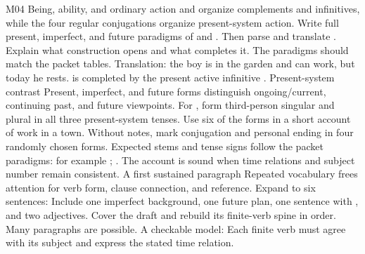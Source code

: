 \begin{courseunit}{M04}
\SubmoduleExtension
  {Being, ability, and ordinary action}
  { and  organize complements and infinitives, while
  the four regular conjugations organize present-system action.}
  {Write full present, imperfect, and future paradigms of  and
  .  Then parse and translate .}
  {Explain what construction  opens and what completes it.}
  {The paradigms should match the packet tables.  Translation: the boy is in
  the garden and can work, but today he rests.   is completed by
  the present active infinitive .}
\SubmoduleExtension
  {Present-system contrast}
  {Present, imperfect, and future forms distinguish ongoing/current,
  continuing past, and future viewpoints.}
  {For , form third-person singular and
  plural in all three present-system tenses.  Use six of the forms in a short
  account of work in a town.}
  {Without notes, mark conjugation and personal ending in four randomly chosen
  forms.}
  {Expected stems and tense signs follow the packet paradigms: for example
  ;
  .  The account is
  sound when time relations and subject number remain consistent.}
\SubmoduleExtension
  {A first sustained paragraph}
  {Repeated vocabulary frees attention for verb form, clause connection, and
  reference.}
  {Expand to six sentences:   Include one imperfect background, one future plan, one
  sentence with , and two adjectives.}
  {Cover the draft and rebuild its finite-verb spine in order.}
  {Many paragraphs are possible.  A checkable model:   Each finite
  verb must agree with its subject and express the stated time relation.}
\end{courseunit}

